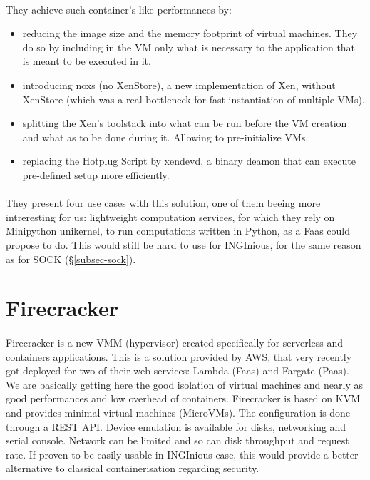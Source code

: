 \paragraph{}They achieve such container's like performances by:
\begin{itemize}
\renewcommand\labelitemi{--}
  \item reducing the image size and the memory footprint of virtual machines.  They do so by including in the VM only what is necessary to the application that is meant to be executed in it.
  \item introducing noxs (no XenStore), a new implementation of Xen, without XenStore (which was a real bottleneck for fast instantiation of multiple VMs).
  \item splitting the Xen's toolstack into what can be run before the VM creation and what as to be done during it.  Allowing to pre-initialize VMs.
  \item replacing the Hotplug Script by xendevd, a binary deamon that can execute pre-defined setup more efficiently.
\end{itemize}

\paragraph{}They present four use cases with this solution, one of them beeing more intreresting for us: lightweight computation services, for which they rely on Minipython unikernel, to run computations written in Python, as a Faas could propose to do.  This would still be hard to use for INGInious, for the same reason as for SOCK (§\ref{subsec-sock}).

\section{Firecracker} 
\paragraph{} Firecracker is a new VMM (hypervisor) created specifically for serverless and containers applications.  \cite{agachefirecracker}  This is a solution provided by AWS, that very recently got deployed for two of their web services: Lambda (Faas) and Fargate (Paas).  We are basically getting here the good isolation of virtual machines and nearly as good performances and low overhead of containers.  Firecracker is based on KVM and provides minimal virtual machines (MicroVMs).  The configuration is done through a REST API.  Device emulation is available for disks, networking and serial console.  Network can be limited and so can disk throughput and request rate.  If proven to be easily usable in INGInious case, this would provide a better alternative to classical containerisation regarding security.

